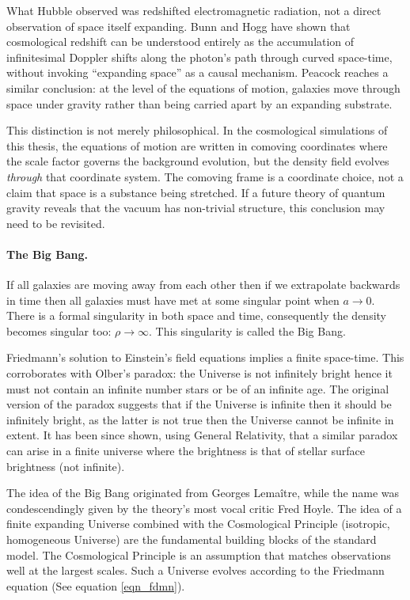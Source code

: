 What Hubble observed was redshifted electromagnetic radiation, not a direct observation of space itself expanding. Bunn and Hogg \citep{bib_bunn} have shown that cosmological redshift can be understood entirely as the accumulation of infinitesimal Doppler shifts along the photon's path through curved space-time, without invoking ``expanding space'' as a causal mechanism. Peacock \citep{bib_pea2} reaches a similar conclusion: at the level of the equations of motion, galaxies move through space under gravity rather than being carried apart by an expanding substrate.

This distinction is not merely philosophical. In the cosmological simulations of this thesis, the equations of motion are written in comoving coordinates where the scale factor governs the background evolution, but the density field evolves \emph{through} that coordinate system. The comoving frame is a coordinate choice, not a claim that space is a substance being stretched. If a future theory of quantum gravity reveals that the vacuum has non-trivial structure, this conclusion may need to be revisited.

\paragraph{The Big Bang.} If all galaxies are moving away from each other then if we extrapolate backwards in time then all galaxies must have met at some singular point when $a \rightarrow 0$. There is a formal singularity in both space and time, consequently the density becomes singular too: $\rho\rightarrow \infty$. This singularity is called the Big Bang.

Friedmann's solution to Einstein's field equations implies a finite space-time. This corroborates with Olber's paradox: the Universe is not infinitely bright hence it must not contain an infinite number stars or be of an infinite age. The original version of the paradox suggests that if the Universe is infinite then it should be infinitely bright, as the latter is not true then the Universe cannot be infinite in extent. It has been since shown, using General Relativity, that a similar paradox can arise in a finite universe where the brightness is that of stellar surface brightness (not infinite).

The idea of the Big Bang originated from Georges Lema\^itre, while the name was condescendingly given by the theory's most vocal critic Fred Hoyle. The idea of a finite expanding Universe combined with the Cosmological Principle (isotropic, homogeneous Universe) are the fundamental building blocks of the standard model. The Cosmological Principle is an assumption that matches observations well at the largest scales. Such a Universe evolves according to the Friedmann equation (See equation \ref{eqn_fdmn}).

